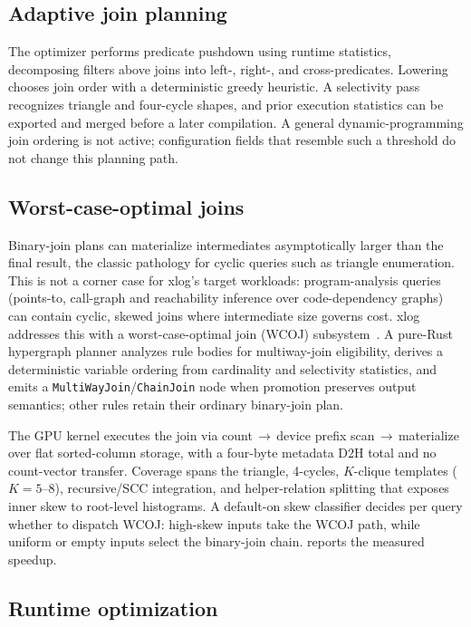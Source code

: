 \subsection{Adaptive join planning}

The optimizer performs predicate pushdown using runtime statistics, decomposing filters above joins into left-, right-, and cross-predicates. Lowering chooses join order with a deterministic greedy heuristic. A selectivity pass recognizes triangle and four-cycle shapes, and prior execution statistics can be exported and merged before a later compilation. A general dynamic-programming join ordering is not active; configuration fields that resemble such a threshold do not change this planning path.

\subsection{Worst-case-optimal joins}

Binary-join plans can materialize intermediates asymptotically larger than the final result, the classic pathology for cyclic queries such as triangle enumeration. This is not a corner case for xlog's target workloads: program-analysis queries (points-to, call-graph and reachability inference over code-dependency graphs) can contain cyclic, skewed joins where intermediate size governs cost. xlog addresses this with a worst-case-optimal join (WCOJ) subsystem~\cite{ngo2018wcoj,veldhuizen2014leapfrog,wang2023freejoin}. A pure-Rust hypergraph planner analyzes rule bodies for multiway-join eligibility, derives a deterministic variable ordering from cardinality and selectivity statistics, and emits a \texttt{MultiWayJoin}/\texttt{ChainJoin} node when promotion preserves output semantics; other rules retain their ordinary binary-join plan.

The GPU kernel executes the join via count\,$\to$\,device prefix scan\,$\to$\,materialize over flat sorted-column storage, with a four-byte metadata D2H total and no count-vector transfer. Coverage spans the triangle, 4-cycles, $K$-clique templates ($K{=}5$--$8$), recursive/SCC integration, and helper-relation splitting that exposes inner skew to root-level histograms. A default-on skew classifier decides per query whether to dispatch WCOJ: high-skew inputs take the WCOJ path, while uniform or empty inputs select the binary-join chain.  reports the measured speedup.

\subsection{Runtime optimization}

